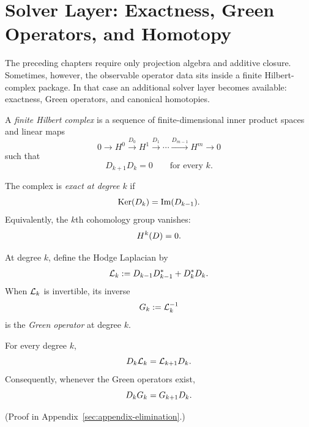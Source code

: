 \section{Solver Layer: Exactness, Green Operators, and Homotopy}
\label{subsec:solver-layer}

The preceding chapters require only projection algebra and additive closure.
Sometimes, however, the observable operator data sits inside a finite
Hilbert-complex package. In that case an additional solver layer becomes
available: exactness, Green operators, and canonical homotopies.

\begin{definition}
\label{def:hilbert-complex}
A \emph{finite Hilbert complex} is a sequence of finite-dimensional inner
product spaces and linear maps
\[
0 \longrightarrow H^0 \xrightarrow{D_0} H^1 \xrightarrow{D_1} \cdots
\xrightarrow{D_{m-1}} H^m \longrightarrow 0
\]
such that
\[
D_{k+1} D_k = 0
\qquad
\text{for every } k.
\]
\end{definition}

\begin{definition}[Exactness]
\label{def:exactness}
The complex is \emph{exact at degree $k$} if
\[
\mathrm{Ker}(D_k) = \mathrm{Im}(D_{k-1}).
\]
Equivalently, the $k$th cohomology group vanishes:
\[
H^{k}(D) = 0.
\]
\end{definition}

\begin{definition}
\label{def:green-operator}
At degree $k$, define the Hodge Laplacian by
\[
\mathcal{L}_{k} := D_{k-1} D_{k-1}^* + D_k^* D_k.
\]
When $\mathcal{L}_{k}$ is invertible, its inverse
\[
G_{k} := \mathcal{L}_{k}^{-1}
\]
is the \emph{Green operator} at degree $k$.
\end{definition}

\begin{lemma}
\label{lem:laplacian-intertwining}
For every degree $k$,
\[
D_k \mathcal{L}_{k} = \mathcal{L}_{k+1} D_k.
\]
Consequently, whenever the Green operators exist,
\[
D_k G_{k} = G_{k+1} D_k.
\]
\end{lemma}

(Proof in Appendix~\ref{sec:appendix-elimination}.)

